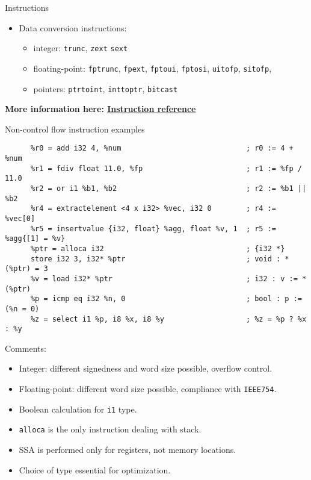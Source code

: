 \documentclass[8pt]{beamer}
\begin{document}
\begin{frame}[fragile]{Instructions}
\begin{block}{}
\begin{itemize}
      \item Data conversion instructions:
        \begin{itemize}
          \item integer: \verb+trunc+, \verb+zext+ \verb+sext+
          \item floating-point: \verb+fptrunc+, \verb+fpext+, \verb+fptoui+,
            \verb+fptosi+, \verb+uitofp+, \verb+sitofp+,
          \item pointers: \verb+ptrtoint+, \verb+inttoptr+, \verb+bitcast+
        \end{itemize}
    \end{itemize}
    \textbf{More information here: \href{http://llvm.org/docs/LangRef.html\#instruction-reference}{Instruction reference}}
  \end{block}
\end{frame}

\begin{frame}[fragile]{Non-control flow instruction examples}
  \begin{exampleblock}{}
    \begin{verbatim}
      %r0 = add i32 4, %num                             ; r0 := 4 + %num
      %r1 = fdiv float 11.0, %fp                        ; r1 := %fp / 11.0
      %r2 = or i1 %b1, %b2                              ; r2 := %b1 || %b2
      %r4 = extractelement <4 x i32> %vec, i32 0        ; r4 := %vec[0]
      %r5 = insertvalue {i32, float} %agg, float %v, 1  ; r5 := %agg{[1] = %v}
      %ptr = alloca i32                                 ; {i32 *}
      store i32 3, i32* %ptr                            ; void : *(%ptr) = 3
      %v = load i32* %ptr                               ; i32 : v := *(%ptr)
      %p = icmp eq i32 %n, 0                            ; bool : p := (%n = 0)
      %z = select i1 %p, i8 %x, i8 %y                   ; %z = %p ? %x : %y
    \end{verbatim}
  \end{exampleblock}

  \begin{block}{Comments:}
    \begin{itemize}
      \item Integer: different signedness and word size possible, overflow
        control.
      \item Floating-point: different word size possible, compliance with
        \verb+IEEE754+.
      \item Boolean calculation for \verb+i1+ type.
      \item \verb+alloca+ is the only instruction dealing with stack.
      \item SSA is performed only for registers, not memory locations.
      \item Choice of type essential for optimization.
    \end{itemize}
  \end{block}
\end{frame}
\end{document}
